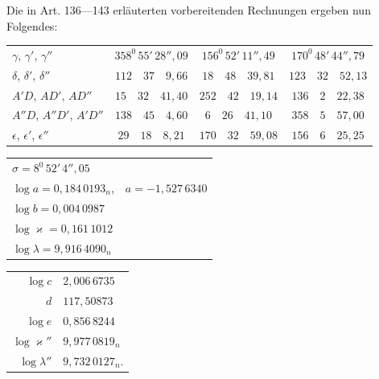 Die in Art. 136---143 erläuterten vorbereitenden Rechnungen ergeben nun Folgendes:
\begin{center}\begingroup\footnotesize\setlength{\tabcolsep}{3pt}\renewcommand{\arraystretch}{1.3}
\begin{tabular}{l|c|c|c}
$\gamma$, $\gamma'$, $\gamma''$ & $358^0\,55'\,28''{,}09$ & $156^0\,52'\,11''{,}49$ & $170^0\,48'\,44''{,}79$ \\
$\delta$, $\delta'$, $\delta''$ & $112\quad37\quad9{,}66$ & $18\quad48\quad39{,}81$ & $123\quad32\quad52{,}13$ \\
$A'D$, $AD'$, $AD''$ & $15\quad32\quad41{,}40$ & $252\quad42\quad19{,}14$ & $136\quad2\quad22{,}38$ \\
$A''D$, $A''D'$, $A'D''$ & $138\quad45\quad4{,}60$ & $6\quad26\quad41{,}10$ & $358\quad5\quad57{,}00$ \\
$\epsilon$, $\epsilon'$, $\epsilon''$ & $29\quad18\quad8{,}21$ & $170\quad32\quad59{,}08$ & $156\quad6\quad25{,}25$ \\
\end{tabular}
\endgroup\end{center}
\begin{center}\begingroup\footnotesize\setlength{\tabcolsep}{3pt}\renewcommand{\arraystretch}{1.3}
\begin{tabular}{ll}
$\sigma=8^0\,52'\,4''{,}05$ & \\
$\log a=0{,}184\,0193_n$, & $a=-1{,}527\,6340$\\
$\log b=0{,}004\,0987$ & \\
$\log\varkappa=0{,}161\,1012$ & \\
$\log\lambda=9{,}916\,4090_n$ &
\end{tabular}
\par\smallskip
\begin{tabular}{r@{\;=\;}l}
$\log c$ & $2{,}006\,6735$\\
$d$ & $117{,}50873$\\
$\log e$ & $0{,}856\,8244$\\
$\log\varkappa''$ & $9{,}977\,0819_n$\\
$\log\lambda''$ & $9{,}732\,0127_n$.
\end{tabular}
\endgroup\end{center}

